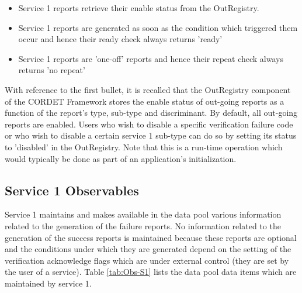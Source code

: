 \documentclass{pnp_article}
\begin{document}
\begin{itemize}
\item Service 1 reports retrieve their enable status from the OutRegistry.
\item Service 1 reports are generated as soon as the condition which triggered them occur and hence their ready check always returns 'ready'
\item Service 1 reports are 'one-off' reports and hence their repeat check always returns 'no repeat'
\end{itemize}

With reference to the first bullet, it is recalled that the OutRegistry component of the CORDET Framework stores the enable status of out-going reports as a function of the report's type, sub-type and discriminant. By default, all out-going reports are enabled. Users who wish to disable a specific verification failure code or who wish to disable a certain service 1 sub-type can do so by setting its status to 'disabled' in the OutRegistry. Note that this is a run-time operation which would typically be done as part of an application's initialization.

\newpage
{}
\newpage
{}
\newpage
{}
\newpage
{}


\subsection{Service 1 Observables}\label{sec:serv1Obs}
Service 1 maintains and makes available in the data pool various information related to the generation of the failure reports. No information related to the generation of the success reports is maintained because these reports are optional and the conditions under which they are generated depend on the setting of the verification acknowledge flags which are under external control (they are set by the user of a service). Table \ref{tab:Obs-S1} lists the data pool data items which are maintained by service 1.

\end{document}
